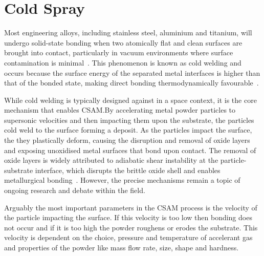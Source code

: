 
\section{Cold Spray}\label{sec:cold-spray}
Most engineering alloys, including stainless steel, aluminium and titanium, will undergo solid-state bonding when two atomically flat and clean surfaces are brought into contact, particularly in vacuum environments where surface contamination is minimal~\cite{merstallinger2009coldwelding}. 
This phenomenon is known as cold welding and occurs because the surface energy of the separated metal interfaces is higher than that of the bonded state, making direct bonding thermodynamically favourable~\cite{WagleBaker2015}. 

While cold welding is typically designed against in a space context, it is the core mechanism that enables CSAM.\@ By accelerating metal powder particles to supersonic velocities and then impacting them upon the substrate, the particles cold weld to the surface forming a deposit. As the particles impact the surface, the they plastically deform, causing the disruption and removal of oxide layers and exposing unoxidised metal surfaces that bond upon contact. The removal of oxide layers is widely attributed to adiabatic shear instability at the particle-substrate interface, which disrupts the brittle oxide shell and enables metallurgical bonding~\cite{assadi2016cold}. However, the precise mechanisms remain a topic of ongoing research and debate within the field.

Arguably the most important parameters in the CSAM process is the velocity of the particle impacting the surface. If this velocity is too low then bonding does not occur and if it is too high the powder roughens or erodes the substrate. This velocity is dependent on the choice, pressure and temperature of accelerant gas and properties of the powder like mass flow rate, size, shape and hardness. 
\newpage
